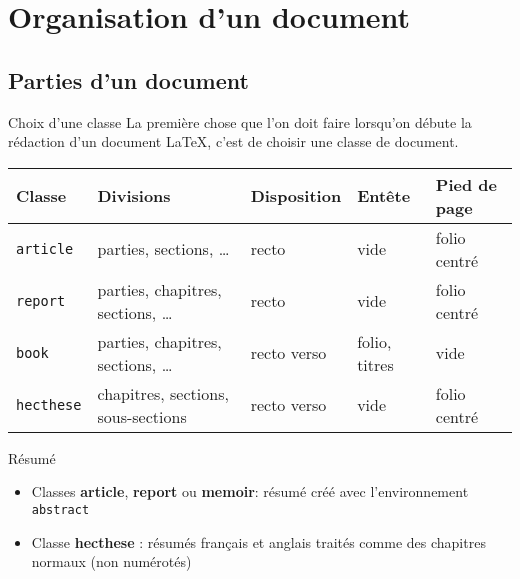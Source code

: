 
\section{Organisation d'un document}

\subsection{Parties d'un document}

\begin{frame}[c]{Choix d'une classe}
	La première chose que l'on doit faire lorsqu'on débute la rédaction d'un document \LaTeX,
	c'est de choisir une classe de document.
	
	\begin{table}[c]
		\begin{tabularx}{\textwidth}{lllll}
			\arrayrulecolor{grisPrimaire!40}\hline\hline
			\textbf{Classe} & \textbf{Divisions} & \textbf{Disposition} & \textbf{Entête} &	\textbf{Pied de page} \\
			\hline
			\texttt{article}			&	parties, sections, \ldots				&	recto		&	vide			&	folio centré \\
			\texttt{report}				&	parties, chapitres, sections, \ldots	&	recto		&	vide			&	folio centré \\
			\texttt{book}				&	parties, chapitres, sections, \ldots	&	recto verso	&
			folio, titres	&	vide \\
			\texttt{hecthese}	&	chapitres, sections, sous-sections		&	recto verso	&
			vide			&	folio centré \\
			\hline\hline
		\end{tabularx}
	\end{table}
\end{frame}

\begin{frame}[fragile,c]{Résumé}
	\begin{itemize}
		\item Classes \textbf{article}, \textbf{report} ou \textbf{memoir}: résumé créé avec
		l'environnement \lstinline|abstract|
\begin{codesource}
	\begin{abstract}
		...
	\end{abstract}
\end{codesource}

		\item Classe \textbf{hecthese} : résumés français et anglais traités comme des chapitres
		normaux (non numérotés)
	\end{itemize}
\end{frame}

